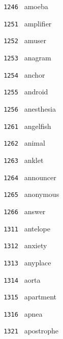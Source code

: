 \documentclass[11pt]{article}
\begin{document}
\begin{multicols}{6}
\noindent \texttt{ 1246 } \hspace{1mm} amoeba  \par
\noindent \texttt{ 1251 } \hspace{1mm} amplifier  \par
\noindent \texttt{ 1252 } \hspace{1mm} amuser  \par
\noindent \texttt{ 1253 } \hspace{1mm} anagram  \par
\noindent \texttt{ 1254 } \hspace{1mm} anchor  \par
\noindent \texttt{ 1255 } \hspace{1mm} android  \par
\noindent \texttt{ 1256 } \hspace{1mm} anesthesia  \par
\noindent \texttt{ 1261 } \hspace{1mm} angelfish  \par
\noindent \texttt{ 1262 } \hspace{1mm} animal  \par
\noindent \texttt{ 1263 } \hspace{1mm} anklet  \par
\noindent \texttt{ 1264 } \hspace{1mm} announcer  \par
\noindent \texttt{ 1265 } \hspace{1mm} anonymous  \par
\noindent \texttt{ 1266 } \hspace{1mm} answer  \par
\noindent \texttt{ 1311 } \hspace{1mm} antelope  \par
\noindent \texttt{ 1312 } \hspace{1mm} anxiety  \par
\noindent \texttt{ 1313 } \hspace{1mm} anyplace  \par
\noindent \texttt{ 1314 } \hspace{1mm} aorta  \par
\noindent \texttt{ 1315 } \hspace{1mm} apartment  \par
\noindent \texttt{ 1316 } \hspace{1mm} apnea  \par
\noindent \texttt{ 1321 } \hspace{1mm} apostrophe  \par

\end{multicols}
\end{document}
